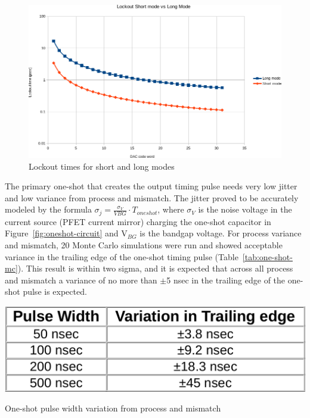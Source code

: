 \documentclass[12pt,oneside,final]{siuethesis}
\theoremstyle{definition}
\begin{document}
\begin{figure}[htbp!]
 \centering
 \includegraphics[scale=.63,keepaspectratio=true]{./ch4_figures/lockout_plot.png}
 \caption{Lockout times for short and long modes}
 \label{fig:lockout-spread}
\end{figure}

\par The primary one-shot that creates the output timing pulse needs very low jitter and low variance from process and mismatch. The jitter proved to be accurately modeled by the formula $\sigma_{j} = \frac{\sigma_{V}}{V{BG}}\cdot T_{oneshot}$, where $\sigma_{V}$ is the noise voltage in the current source (PFET current mirror) charging the one-shot capacitor in Figure~\ref{fig:oneshot-circuit} and V$_{BG}$ is the bandgap voltage. For process variance and mismatch, 20 Monte Carlo simulations were run and showed acceptable variance in the trailing edge of the one-shot timing pulse (Table~\ref{tab:one-shot-mc}). This result is within two sigma, and it is expected that across all process and mismatch a variance of no more than $\pm$5 nsec in the trailing edge of the one-shot pulse is expected.

\begin{table}[htbp!]
 \centering
 \includegraphics[scale=.25,keepaspectratio=true]{../data/oneshot_mc.png}
 \caption{One-shot pulse width variation from process and mismatch}
 \label{tab:one-shot-mc}
\end{table}
\end{document}
